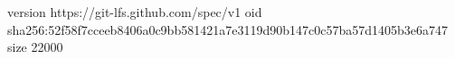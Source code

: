 version https://git-lfs.github.com/spec/v1
oid sha256:52f58f7cceeb8406a0c9bb581421a7e3119d90b147c0c57ba57d1405b3e6a747
size 22000
